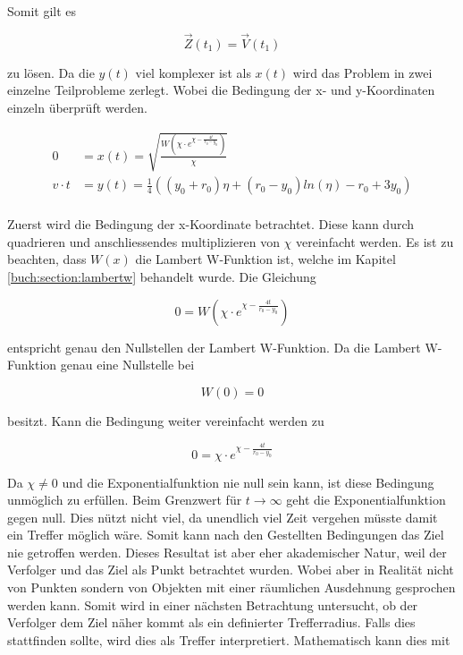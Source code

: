 Somit gilt es

\begin{equation*}
    \vec{Z}(t_1)=\vec{V}(t_1)
\end{equation*}

zu lösen. Da die $y(t)$ viel komplexer ist als $x(t)$ wird das Problem in zwei einzelne Teilprobleme zerlegt. Wobei die Bedingung der x- und y-Koordinaten einzeln überprüft werden.

\begin{align*}
    0
    &=
    x(t)
    =
    \sqrt{\frac{W\left(\chi\cdot e^{\chi-\frac{4t}{r_0-y_0}}\right)}{\chi}}
    \\
    v \cdot t
    &=
    y(t)
    =
    \frac{1}{4}\left(\left(y_0+r_0\right)\eta+\left(r_0-y_0\right)ln\left(\eta\right)-r_0+3y_0\right)
    \\
\end{align*}

Zuerst wird die Bedingung der x-Koordinate betrachtet.
Diese kann durch quadrieren und anschliessendes multiplizieren von $\chi$ vereinfacht werden.
Es ist zu beachten, dass $W(x)$ die Lambert W-Funktion ist, welche im Kapitel \eqref{buch:section:lambertw} behandelt wurde.
Die Gleichung

\begin{equation}
    0
    =
    W\left(\chi\cdot e^{\chi-\frac{4t}{r_0-y_0}}\right)
\end{equation}


entspricht genau den Nullstellen der Lambert W-Funktion. Da die Lambert W-Funktion genau eine Nullstelle bei

\begin{equation*}
    W(0)=0
\end{equation*}

besitzt. Kann die Bedingung weiter vereinfacht werden zu

\begin{equation}
    0
    =
    \chi\cdot e^{\chi-\frac{4t}{r_0-y_0}}
\end{equation}

Da $\chi\neq0$ und die Exponentialfunktion nie null sein kann, ist diese Bedingung unmöglich zu erfüllen.
Beim Grenzwert für $t\rightarrow\infty$ geht die Exponentialfunktion gegen null.
Dies nützt nicht viel, da unendlich viel Zeit vergehen müsste damit ein Treffer möglich wäre.
Somit kann nach den Gestellten Bedingungen das Ziel nie getroffen werden.
Dieses Resultat ist aber eher akademischer Natur, weil der Verfolger und das Ziel als Punkt betrachtet wurden.
Wobei aber in Realität nicht von Punkten sondern von Objekten mit einer räumlichen Ausdehnung gesprochen werden kann.
Somit wird in einer nächsten Betrachtung untersucht, ob der Verfolger dem Ziel näher kommt als ein definierter Trefferradius.
Falls dies stattfinden sollte, wird dies als Treffer interpretiert.
Mathematisch kann dies mit

